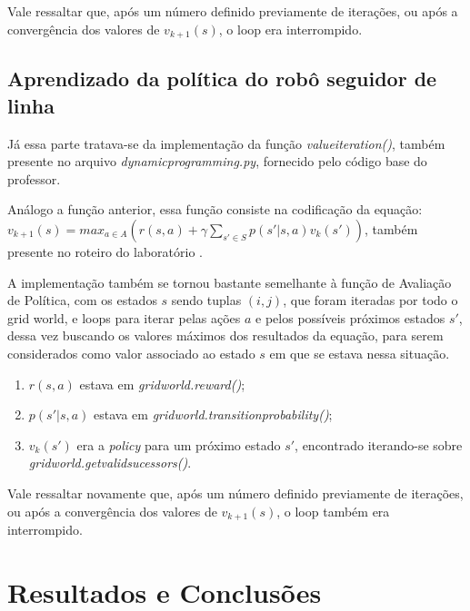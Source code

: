 \documentclass[conference]{IEEEtran}
\begin{document}
Vale ressaltar que, após um número definido previamente de iterações, ou após a convergência dos valores de $v_{k+1}(s)$, o loop era interrompido.

\subsection{Aprendizado da política do robô seguidor de linha}
Já essa parte tratava-se da implementação da função \textit{value\underline{\space}iteration()}, também presente no arquivo \textit{dynamic\underline{\space}programming.py}, fornecido pelo código base do professor.

Análogo a função anterior, essa função consiste na codificação da equação: $v_{k+1}\left ( s \right ) = max_{a \in A} \left (  r \left ( s, a \right ) + \gamma \sum_{s'\in S} p \left ( s' | s, a \right ) v_k \left ( s' \right ) \right )$, também presente no roteiro do laboratório \cite{roteiro}.

A implementação também se tornou bastante semelhante à função de Avaliação de Política, com os estados $s$ sendo tuplas $(i, j)$, que foram iteradas por todo o grid world, e loops para iterar pelas ações $a$ e pelos possíveis próximos estados $s'$, dessa vez buscando os valores máximos dos resultados da equação, para serem considerados como valor associado ao estado $s$ em que se estava nessa situação. 

\begin{enumerate}
\item $r \left ( s, a \right )$ estava em \textit{grid\underline{\space}world.reward()};

\item $p \left ( s' | s, a \right )$ estava em \textit{grid\underline{\space}world.transition\underline{\space}probability()};

\item $v_k \left ( s' \right )$ era a \textit{policy} para um próximo estado $s'$, encontrado iterando-se sobre \textit{grid\underline{\space}world.get\underline{\space}valid\underline{\space}sucessors()}.
\end{enumerate}

Vale ressaltar novamente que, após um número definido previamente de iterações, ou após a convergência dos valores de $v_{k+1}(s)$, o loop também era interrompido.

\section{Resultados e Conclusões}
\end{document}
